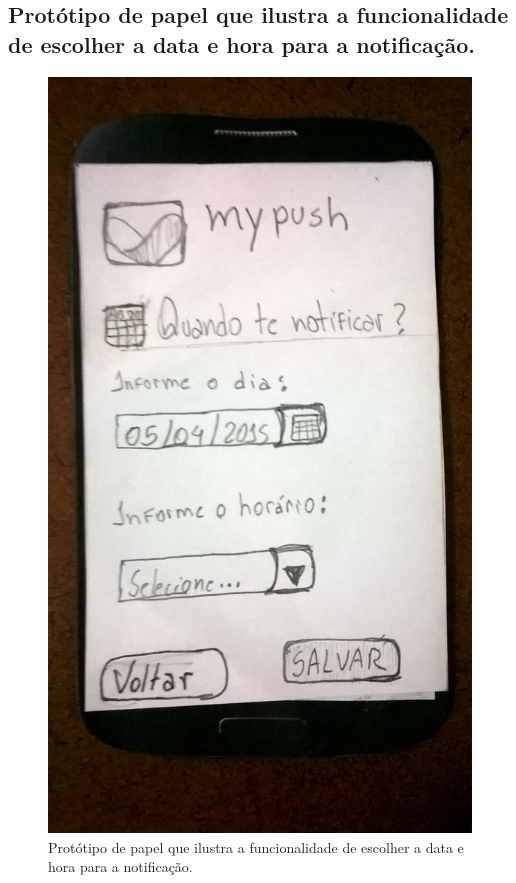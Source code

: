 \begin{apendicesenv}
    \pagebreak
    \section*{Protótipo de papel que ilustra a funcionalidade de escolher a data e hora para a notificação.}
    
      \begin{figure}[!htbp]
	\centering
	\includegraphics[scale=0.32, angle=-90]{editaveis/figuras/prototipo_papel_v1/quando_notificar}
	\caption{Protótipo de papel que ilustra a funcionalidade de escolher a data e hora para a notificação.}
	\label{quando_notificar_v1}
      \end{figure}
      

\end{apendicesenv}
